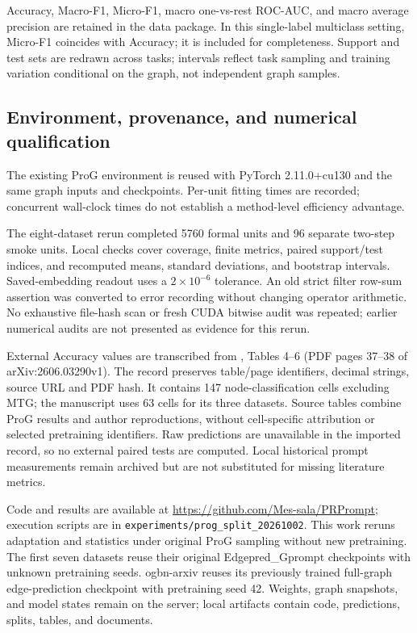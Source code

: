 Accuracy, Macro-F1, Micro-F1, macro one-vs-rest ROC-AUC, and macro average precision are retained in the data package. In this single-label multiclass setting, Micro-F1 coincides with Accuracy; it is included for completeness. Support and test sets are redrawn across tasks; intervals reflect task sampling and training variation conditional on the graph, not independent graph samples.

\subsection{Environment, provenance, and numerical qualification}
The existing ProG environment is reused with PyTorch 2.11.0+cu130 and the same graph inputs and checkpoints. Per-unit fitting times are recorded; concurrent wall-clock times do not establish a method-level efficiency advantage.

The eight-dataset rerun completed 5760 formal units and 96 separate two-step smoke units. Local checks cover coverage, finite metrics, paired support/test indices, and recomputed means, standard deviations, and bootstrap intervals. Saved-embedding readout uses a $2\times10^{-6}$ tolerance. An old strict filter row-sum assertion was converted to error recording without changing operator arithmetic. No exhaustive file-hash scan or fresh CUDA bitwise audit was repeated; earlier numerical audits are not presented as evidence for this rerun.

External Accuracy values are transcribed from \citet{mtg2026}, Tables 4--6 (PDF pages 37--38 of arXiv:2606.03290v1). The record preserves table/page identifiers, decimal strings, source URL and PDF hash. It contains 147 node-classification cells excluding MTG; the manuscript uses 63 cells for its three datasets. Source tables combine ProG results and author reproductions, without cell-specific attribution or selected pretraining identifiers. Raw predictions are unavailable in the imported record, so no external paired tests are computed. Local historical prompt measurements remain archived but are not substituted for missing literature metrics.

Code and results are available at \url{https://github.com/Mes-sala/PRPrompt}; execution scripts are in \texttt{experiments/prog\_split\_20261002}. This work reruns adaptation and statistics under original ProG sampling without new pretraining. The first seven datasets reuse their original Edgepred\_Gprompt checkpoints with unknown pretraining seeds. ogbn-arxiv reuses its previously trained full-graph edge-prediction checkpoint with pretraining seed 42. Weights, graph snapshots, and model states remain on the server; local artifacts contain code, predictions, splits, tables, and documents.

